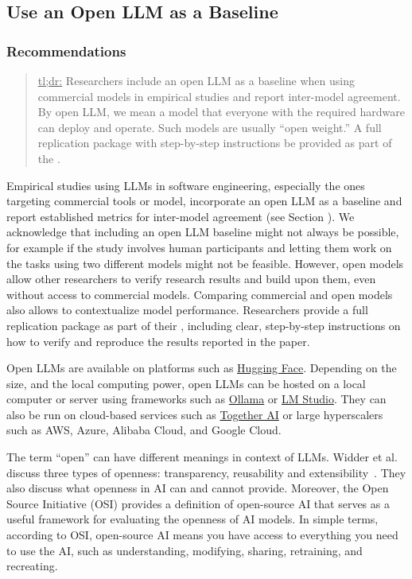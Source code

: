 



\subsection{Use an Open LLM as a Baseline}

\subsubsection{Recommendations}

\begin{quote}
\underline{tl;dr:} Researchers \should include an open LLM as a baseline when using commercial models in empirical studies and report inter-model agreement. By open LLM, we mean a model that everyone with the required hardware can deploy and operate. Such models are usually ``open weight.'' A full replication package with step-by-step instructions \should be provided as part of the \supplementarymaterial.
\end{quote}

Empirical studies using LLMs in software engineering, especially the ones targeting commercial tools or model, \should incorporate an open LLM as a baseline and report established metrics for inter-model agreement (see Section \benchmarksmetrics).
We acknowledge that including an open LLM baseline might not always be possible, for example if the study involves human participants and letting them work on the tasks using two different models might not be feasible.
However, open models allow other researchers to verify research results and build upon them, even without access to commercial models.
Comparing commercial and open models also allows to contextualize model performance.
Researchers \should provide a full replication package as part of their \supplementarymaterial, including clear, step-by-step instructions on how to verify and reproduce the results reported in the paper.

Open LLMs are available on platforms such as \href{https://huggingface.co/}{Hugging Face}.
Depending on the size, and the local computing power, open LLMs can be hosted on a local computer or server using frameworks such as \href{https://ollama.com/}{Ollama} or \href{https://lmstudio.ai/}{LM Studio}.
They can also be run on cloud-based services such as \href{https://together.ai/}{Together AI} or large hyperscalers such as AWS, Azure, Alibaba Cloud, and Google Cloud.

The term ``open'' can have different meanings in context of LLMs.
Widder et al. discuss three types of openness: transparency, reusability and extensibility~\cite{widder2024open}.
They also discuss what openness in AI can and cannot provide.
Moreover, the Open Source Initiative (OSI) \cite{OSIAI2024} provides a definition of open-source AI that serves as a useful framework for evaluating the openness of AI models.
In simple terms, according to OSI, open-source AI means  you have access to everything you need to use the AI, such as understanding, modifying, sharing, retraining, and recreating.


